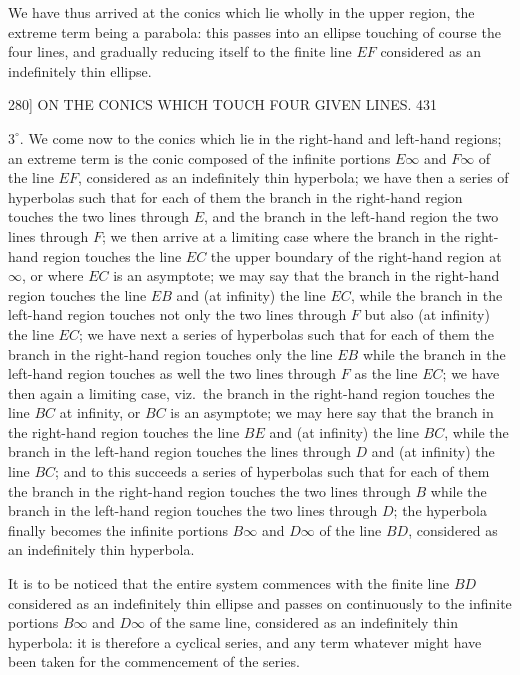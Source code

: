 \documentclass[11pt]{article}
\begin{document}
We have thus arrived at the conics which lie wholly in the upper region, the
extreme term being a parabola: this passes into an ellipse touching of course the
four lines, and gradually reducing itself to the finite line $EF$ considered as an
indefinitely thin ellipse.

\begin{center}
\textsc{280]} \hfill ON THE CONICS WHICH TOUCH FOUR GIVEN LINES. \hfill 431
\end{center}

$3^{\circ}$. We come now to the conics which lie in the right-hand and left-hand
regions; an extreme term is the conic composed of the infinite portions $E\infty$ and
$F\infty$ of the line $EF$, considered as an indefinitely thin hyperbola; we have then
a series of hyperbolas such that for each of them the branch in the right-hand region
touches the two lines through $E$, and the branch in the left-hand region the two
lines through $F$; we then arrive at a limiting case where the branch in the
right-hand region touches the line $EC$ the upper boundary of the right-hand region
at $\infty$, or where $EC$ is an asymptote; we may say that the branch in the
right-hand region touches the line $EB$ and (at infinity) the line $EC$, while the
branch in the left-hand region touches not only the two lines through $F$ but also
(at infinity) the line $EC$; we have next a series of hyperbolas such that for each
of them the branch in the right-hand region touches only the line $EB$ while the
branch in the left-hand region touches as well the two lines through $F$ as the line
$EC$; we have then again a limiting case, viz.\ the branch in the right-hand region
touches the line $BC$ at infinity, or $BC$ is an asymptote; we may here say that the
branch in the right-hand region touches the line $BE$ and (at infinity) the line $BC$,
while the branch in the left-hand region touches the lines through $D$ and (at
infinity) the line $BC$; and to this succeeds a series of hyperbolas such that for
each of them the branch in the right-hand region touches the two lines through $B$
while the branch in the left-hand region touches the two lines through $D$; the
hyperbola finally becomes the infinite portions $B\infty$ and $D\infty$ of the line
$BD$, considered as an indefinitely thin hyperbola.

It is to be noticed that the entire system commences with the finite line $BD$
considered as an indefinitely thin ellipse and passes on continuously to the infinite
portions $B\infty$ and $D\infty$ of the same line, considered as an indefinitely thin
hyperbola: it is therefore a cyclical series, and any term whatever might have been
taken for the commencement of the series.
\end{document}
